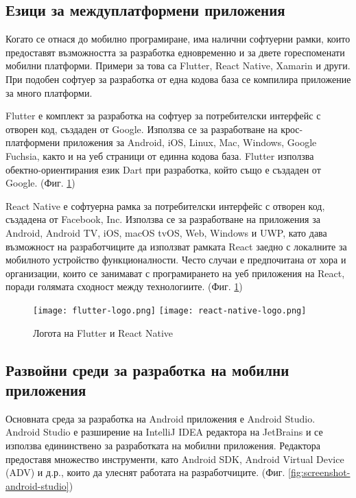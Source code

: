\subsection{Езици за междуплатформени приложения}
Когато се отнася до мобилно програмиране, има налични софтуерни рамки, които предоставят възможността за разработка едновременно и за двете гореспоменати мобилни платформи. Примери за това са Flutter, React Native, Xamarin и други. При подобен софтуер за разработка от една кодова база се компилира приложение за много платформи.

Flutter е комплект за разработка на софтуер за потребителски интерфейс с отворен код, създаден от Google. Използва се за разработване на крос-платформени приложения за Android, iOS, Linux, Mac, Windows, Google Fuchsia, както и на уеб страници от единна кодова база. Flutter използва обектно-ориентирания език Dart при разработка, който също е създаден от Google. (Фиг. \ref{fig:flutter-react-native-logos})

React Native е софтуерна рамка за потребителски интерфейс с отворен код, създадена от Facebook, Inc. Използва се за разработване на приложения за Android, Android TV, iOS, macOS tvOS, Web, Windows и UWP, като дава възможност на разработчиците да използват рамката React заедно с локалните за мобилното устройство функционалности. Често случаи е предпочитана от хора и организации, които се занимават с програмирането на уеб приложения на React, поради голямата сходност между технологиите. (Фиг. \ref{fig:flutter-react-native-logos})

\begin{figure}[H]
    \texttt{[image: flutter-logo.png]}
    \texttt{[image: react-native-logo.png]}
    \centering
    \caption{Логота на Flutter и React Native}
    \label{fig:flutter-react-native-logos}
\end{figure}

\subsection{Развойни среди за разработка на мобилни приложения}
Основната среда за разработка на Android приложения е Android Studio. Android Studio е разширение на IntelliJ IDEA редактора на JetBrains и се използва едининствено за разработката на мобилни приложения. Редактора предоставя множество инструменти, като Android SDK, Android Virtual Device (ADV) и д.р., които да улеснят работата на разработчиците. (Фиг. \ref{fig:screenshot-android-studio})

